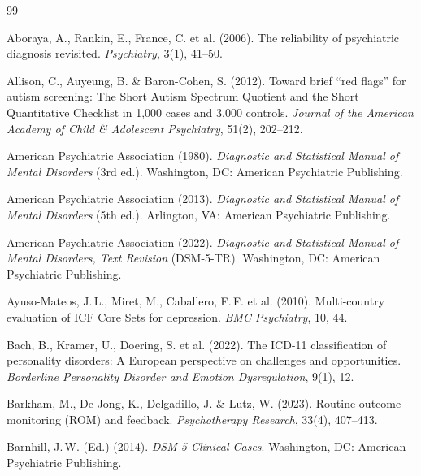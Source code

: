 \documentclass[11pt,a4paper]{article}
\begin{document}
\newpage
\begin{thebibliography}{99}

Aboraya, A., Rankin, E., France, C. et al. (2006).
\newblock The reliability of psychiatric diagnosis revisited.
\newblock \textit{Psychiatry}, 3(1), 41--50.

Allison, C., Auyeung, B. \& Baron-Cohen, S. (2012).
\newblock Toward brief ``red flags'' for autism screening: The Short Autism Spectrum Quotient and the Short Quantitative Checklist in 1,000 cases and 3,000 controls.
\newblock \textit{Journal of the American Academy of Child \& Adolescent Psychiatry}, 51(2), 202--212.

American Psychiatric Association (1980).
\newblock \textit{Diagnostic and Statistical Manual of Mental Disorders} (3rd ed.).
\newblock Washington, DC: American Psychiatric Publishing.

American Psychiatric Association (2013).
\newblock \textit{Diagnostic and Statistical Manual of Mental Disorders} (5th ed.).
\newblock Arlington, VA: American Psychiatric Publishing.

American Psychiatric Association (2022).
\newblock \textit{Diagnostic and Statistical Manual of Mental Disorders, Text Revision} (DSM-5-TR).
\newblock Washington, DC: American Psychiatric Publishing.

Ayuso-Mateos, J.\,L., Miret, M., Caballero, F.\,F. et al. (2010).
\newblock Multi-country evaluation of ICF Core Sets for depression.
\newblock \textit{BMC Psychiatry}, 10, 44.

Bach, B., Kramer, U., Doering, S. et al. (2022).
\newblock The ICD-11 classification of personality disorders: A European perspective on challenges and opportunities.
\newblock \textit{Borderline Personality Disorder and Emotion Dysregulation}, 9(1), 12.

Barkham, M., De Jong, K., Delgadillo, J. \& Lutz, W. (2023).
\newblock Routine outcome monitoring (ROM) and feedback.
\newblock \textit{Psychotherapy Research}, 33(4), 407--413.

Barnhill, J.\,W. (Ed.) (2014).
\newblock \textit{DSM-5 Clinical Cases}.
\newblock Washington, DC: American Psychiatric Publishing.


\end{thebibliography}
\end{document}
